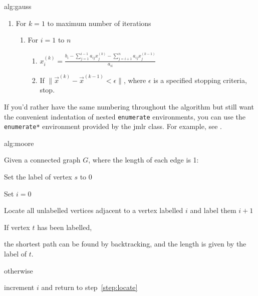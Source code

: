 \documentclass[pmlr,twocolumn]{jmlr} %
\begin{document}
\begin{algorithm}[htbp]
\floatconts
  {alg:gauss}%
  {\caption{The Gauss-Seidel Algorithm}}%
{%
\begin{enumerate}
  \item For $k=1$ to maximum number of iterations
    \begin{enumerate}
      \item For $i=1$ to $n$
        \begin{enumerate}
        \item $x_i^{(k)} = 
          \frac{b_i - \sum_{j=1}^{i-1}a_{ij}x_j^{(k)}
          - \sum_{j=i+1}^{n}a_{ij}x_j^{(k-1)}}{a_{ii}}$
        \item If $\|\vec{x}^{(k)}-\vec{x}^{(k-1)} < \epsilon\|$,
          where $\epsilon$ is a specified stopping criteria, stop.
      \end{enumerate}
    \end{enumerate}
\end{enumerate}
}%
\end{algorithm}

If you'd rather have the same numbering throughout the algorithm
but still want the convenient indentation of nested 
\texttt{enumerate} environments, you can use the
\texttt{enumerate*} environment provided by the \textsf{jmlr}
class. For example, see .

\begin{algorithm}
\floatconts
  {alg:moore}%
  {\caption{Moore's Shortest Path}}%
{%
Given a connected graph $G$, where the length of each edge is 1:
\begin{enumerate*}
  \item Set the label of vertex $s$ to 0
  \item Set $i=0$
  \begin{enumerate*}
    \item \label{step:locate}Locate all unlabelled vertices 
          adjacent to a vertex labelled $i$ and label them $i+1$
    \item If vertex $t$ has been labelled,
    \begin{enumerate*}
      \item[] the shortest path can be found by backtracking, and 
      the length is given by the label of $t$.
    \end{enumerate*}
    otherwise
    \begin{enumerate*}
      \item[] increment $i$ and return to step~\ref{step:locate}
    \end{enumerate*}
  \end{enumerate*}
\end{enumerate*}
}%
\end{algorithm}
\end{document}
